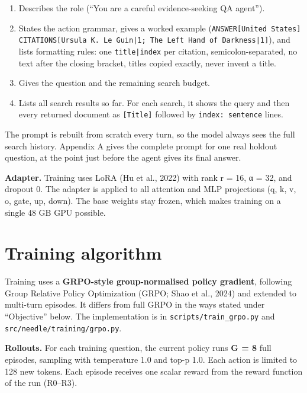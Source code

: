 \begin{enumerate}
\def\labelenumi{\arabic{enumi}.}
\tightlist
\item
  Describes the role (``You are a careful evidence-seeking QA agent'').
\item
  States the action grammar, gives a worked example
  (\texttt{ANSWER{[}\allowbreak{}United States{]} CITATIONS{[}\allowbreak{}Ursula K.\allowbreak{} Le Guin|1; The Left Hand of Darkness|1{]}}),
  and lists formatting rules: one \texttt{title|index} per citation,
  semicolon-separated, no text after the closing bracket, titles copied
  exactly, never invent a title.
\item
  Gives the question and the remaining search budget.
\item
  Lists all search results so far. For each search, it shows the query
  and then every returned document as \texttt{{[}\allowbreak{}Title{]}}
  followed by \texttt{index: sentence} lines.
\end{enumerate}

The prompt is rebuilt from scratch every turn, so the model always sees
the full search history. Appendix A gives the complete prompt for one
real holdout question, at the point just before the agent gives its
final answer.

\textbf{Adapter.} Training uses LoRA (Hu et al., 2022) with rank r = 16,
α = 32, and dropout 0. The adapter is applied to all attention and MLP
projections (q, k, v, o, gate, up, down). The base weights stay frozen,
which makes training on a single 48 GB GPU possible.

\section{Training algorithm}\label{sec:3.6}

Training uses a \textbf{GRPO-style group-normalised policy gradient},
following Group Relative Policy Optimization (GRPO; Shao et al., 2024)
and extended to multi-turn episodes. It differs from full GRPO in the
ways stated under ``Objective'' below. The implementation is in
\texttt{scripts/\allowbreak{}train\_\allowbreak{}grpo.\allowbreak{}py}
and
\texttt{src/\allowbreak{}needle/\allowbreak{}training/\allowbreak{}grpo.\allowbreak{}py}.

\textbf{Rollouts.} For each training question, the current policy runs
\textbf{G = 8} full episodes, sampling with temperature 1.0 and top-p
1.0. Each action is limited to 128 new tokens. Each episode receives one
scalar reward from the reward function of the run (R0--R3).

